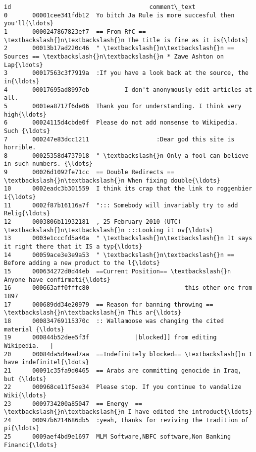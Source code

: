\documentclass[11pt]{article}
\begin{document}
    \begin{Verbatim}[commandchars=\\\{\}]
                      id                                       comment\_text
0       00001cee341fdb12  Yo bitch Ja Rule is more succesful then you'll{\ldots}
1       0000247867823ef7  == From RfC == \textbackslash{}n\textbackslash{}n The title is fine as it is{\ldots}
2       00013b17ad220c46  " \textbackslash{}n\textbackslash{}n == Sources == \textbackslash{}n\textbackslash{}n * Zawe Ashton on Lap{\ldots}
3       00017563c3f7919a  :If you have a look back at the source, the in{\ldots}
4       00017695ad8997eb          I don't anonymously edit articles at all.
5       0001ea8717f6de06  Thank you for understanding. I think very high{\ldots}
6       00024115d4cbde0f  Please do not add nonsense to Wikipedia. Such {\ldots}
7       000247e83dcc1211                   :Dear god this site is horrible.
8       00025358d4737918  " \textbackslash{}n Only a fool can believe in such numbers. {\ldots}
9       00026d1092fe71cc  == Double Redirects == \textbackslash{}n\textbackslash{}n When fixing double{\ldots}
10      0002eadc3b301559  I think its crap that the link to roggenbier i{\ldots}
11      0002f87b16116a7f  "::: Somebody will invariably try to add Relig{\ldots}
12      0003806b11932181  , 25 February 2010 (UTC) \textbackslash{}n\textbackslash{}n :::Looking it ov{\ldots}
13      0003e1cccfd5a40a  " \textbackslash{}n\textbackslash{}n It says it right there that it IS a typ{\ldots}
14      00059ace3e3e9a53  " \textbackslash{}n\textbackslash{}n == Before adding a new product to the l{\ldots}
15      000634272d0d44eb  ==Current Position== \textbackslash{}n Anyone have confirmati{\ldots}
16      000663aff0fffc80                           this other one from 1897
17      000689dd34e20979  == Reason for banning throwing == \textbackslash{}n\textbackslash{}n This ar{\ldots}
18      000834769115370c  :: Wallamoose was changing the cited material {\ldots}
19      000844b52dee5f3f             |blocked]] from editing Wikipedia.   |
20      00084da5d4ead7aa  ==Indefinitely blocked== \textbackslash{}n I have indefinitel{\ldots}
21      00091c35fa9d0465  == Arabs are committing genocide in Iraq, but {\ldots}
22      000968ce11f5ee34  Please stop. If you continue to vandalize Wiki{\ldots}
23      0009734200a85047  == Energy  == \textbackslash{}n\textbackslash{}n I have edited the introduct{\ldots}
24      00097b6214686db5  :yeah, thanks for reviving the tradition of pi{\ldots}
25      0009aef4bd9e1697  MLM Software,NBFC software,Non Banking Financi{\ldots}

\end{Verbatim}
\end{document}
